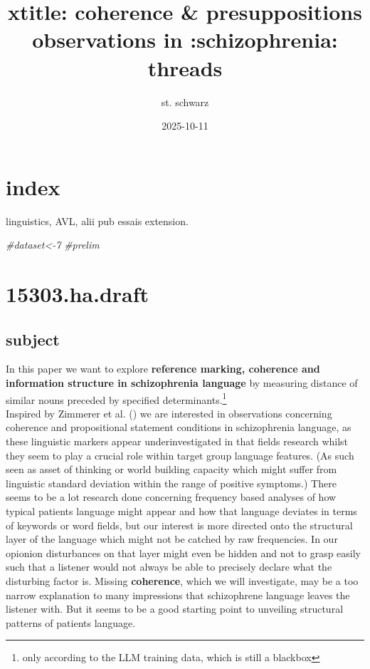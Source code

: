 \documentclass[
  12pt,
  oneside]{book}
\title{xtitle: coherence \& presuppositions observations in :schizophrenia: threads}
\author{st. schwarz}
\date{2025-10-11}
\newenvironment{Shaded}{\begin{snugshade}}{\end{snugshade}}
\newcommand{\CommentTok}[1]{\textcolor[rgb]{0.56,0.35,0.01}{\textit{#1}}}
\begin{document}
\maketitle

{
\setcounter{tocdepth}{1}
\tableofcontents
}
\chapter{index}\label{index}

linguistics, AVL, alii pub essais extension.

\begin{Shaded}
\begin{Highlighting}[]
\CommentTok{\#dataset\textless{}{-}7}
\CommentTok{\#prelim}
\end{Highlighting}
\end{Shaded}

\chapter{15303.ha.draft}\label{ha.draft}

\section{subject}\label{subject}

In this paper we want to explore \textbf{reference marking, coherence and information structure in schizophrenia language} by measuring distance of similar nouns preceded by specified determinants.\footnote{only according to the LLM training data, which is still a blackbox}\\
Inspired by Zimmerer et al. () we are interested in observations concerning coherence and propositional statement conditions in schizophrenia language, as these linguistic markers appear underinvestigated in that fields research whilst they seem to play a crucial role within target group language features. (As such seen as asset of thinking or world building capacity which might suffer from linguistic standard deviation within the range of positive symptoms.) There seems to be a lot research done concerning frequency based analyses of how typical patients language might appear and how that language deviates in terms of keywords or word fields, but our interest is more directed onto the structural layer of the language which might not be catched by raw frequencies. In our opionion disturbances on that layer might even be hidden and not to grasp easily such that a listener would not always be able to precisely declare what the disturbing factor is. Missing \textbf{coherence}, which we will investigate, may be a too narrow explanation to many impressions that schizophrene language leaves the listener with. But it seems to be a good starting point to unveiling structural patterns of patients language.
\end{document}
